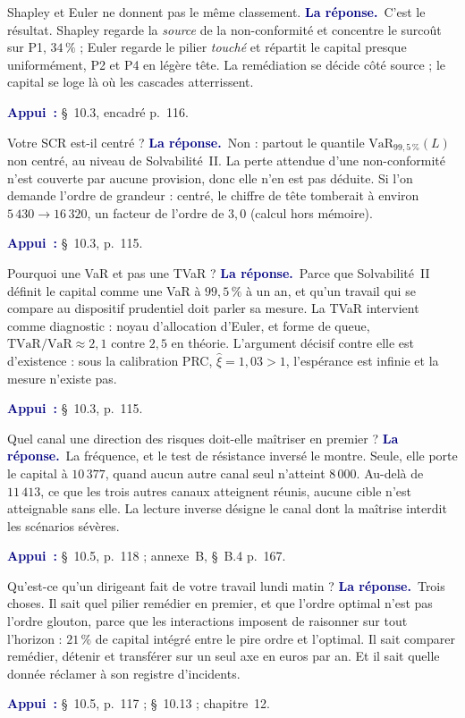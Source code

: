 \documentclass[11pt,a4paper]{article}
\newcommand{\rep}[1]{\smallskip\noindent\textcolor{navy}{\textbf{La réponse.}}\ #1\par}
\newcommand{\appui}[1]{\smallskip\noindent\small\textcolor{navy}{\textbf{Appui~:}} #1\par\normalsize}
\begin{document}
\begin{question}{\og Shapley et Euler ne donnent pas le même classement.\fg{}}
\rep{C'est le résultat. Shapley regarde la \emph{source} de la non-conformité et concentre le
surcoût sur P1, $34\,\%$ ; Euler regarde le pilier \emph{touché} et répartit le capital presque
uniformément, P2 et P4 en légère tête. La remédiation se décide côté source ; le capital se loge
là où les cascades atterrissent.}
\appui{\S~10.3, encadré p.~116.}
\end{question}

\begin{question}{\og Votre SCR est-il centré ?\fg{}}
\rep{Non : partout le quantile $\mathrm{VaR}_{99{,}5\,\%}(L)$ non centré, au niveau de
Solvabilité~II. La perte attendue d'une non-conformité n'est couverte par aucune provision, donc
elle n'en est pas déduite. Si l'on demande l'ordre de grandeur : centré, le chiffre de tête
tomberait à environ $5\,430\to16\,320$, un facteur de l'ordre de $3{,}0$ (calcul hors mémoire).}
\appui{\S~10.3, p.~115.}
\end{question}

\begin{question}{\og Pourquoi une VaR et pas une TVaR ?\fg{}}
\rep{Parce que Solvabilité~II définit le capital comme une VaR à $99{,}5\,\%$ à un an, et qu'un
travail qui se compare au dispositif prudentiel doit parler sa mesure. La TVaR intervient comme
diagnostic : noyau d'allocation d'Euler, et forme de queue, $\mathrm{TVaR}/\mathrm{VaR}\approx2{,}1$
contre $2{,}5$ en théorie. L'argument décisif contre elle est d'existence : sous la calibration
PRC, $\hat\xi=1{,}03>1$, l'espérance est infinie et la mesure n'existe pas.}
\appui{\S~10.3, p.~115.}
\end{question}

\begin{question}{\og Quel canal une direction des risques doit-elle maîtriser en premier ?\fg{}}
\rep{La fréquence, et le test de résistance inversé le montre. Seule, elle porte le capital à
$10\,377$, quand aucun autre canal seul n'atteint $8\,000$. Au-delà de $11\,413$, ce que les trois
autres canaux atteignent réunis, aucune cible n'est atteignable sans elle. La lecture inverse
désigne le canal dont la maîtrise interdit les scénarios sévères.}
\appui{\S~10.5, p.~118 ; annexe~B, \S~B.4 p.~167.}
\end{question}

\begin{question}{\og Qu'est-ce qu'un dirigeant fait de votre travail lundi matin ?\fg{}}
\rep{Trois choses. Il sait quel pilier remédier en premier, et que l'ordre optimal n'est pas
l'ordre glouton, parce que les interactions imposent de raisonner sur tout l'horizon : $21\,\%$ de
capital intégré entre le pire ordre et l'optimal. Il sait comparer remédier, détenir et transférer
sur un seul axe en euros par an. Et il sait quelle donnée réclamer à son registre d'incidents.}
\appui{\S~10.5, p.~117 ; \S~10.13 ; chapitre~12.}
\end{question}
\end{document}
